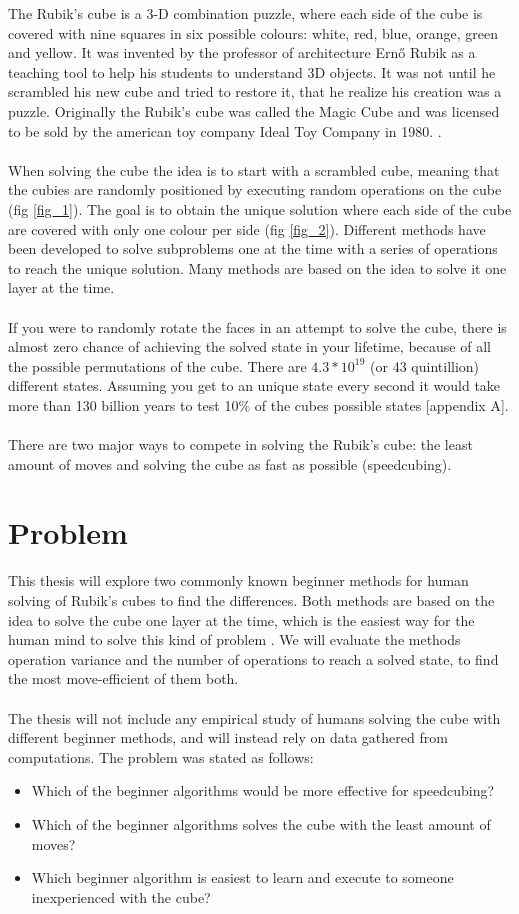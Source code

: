\documentclass[a4paper,11pt]{kth-mag}
\begin{document}
The Rubik’s cube is a 3-D combination puzzle, where each side of the cube is covered with nine squares in six possible colours: white, red, blue, orange, green and yellow. It was invented by the professor of architecture Ernő Rubik as a teaching tool to help his students to understand 3D objects. It was not until he scrambled his new cube and tried to restore it, that he realize his creation was a puzzle. Originally the Rubik's cube was called the Magic Cube and was licensed to be sold by the american toy company Ideal Toy Company in 1980. \cite{Rubiks}.\\\\
When solving the cube the idea is to start with a scrambled cube, meaning that the cubies are randomly positioned by executing random operations on the cube (fig \ref{fig_1}). The goal is to obtain the unique solution where each side of the cube are covered with only one colour per side (fig \ref{fig_2}). Different methods have been developed to solve subproblems one at the time with a series of operations to reach the unique solution. Many methods are based on the idea to solve it one layer at the time.\\\\
If you were to randomly rotate the faces in an attempt to solve the cube, there is almost zero chance of achieving the solved state in your lifetime, because of all the possible permutations of the cube. There are $4.3 * 10^{19}$ (or 43 quintillion) \cite{Faculty} different states. Assuming you get to an unique state every second it would take more than 130 billion years to test 10\% of the cubes possible states [appendix A].\\\\
There are two major ways to compete in solving the Rubik’s cube: the least amount of moves and solving the cube as fast as possible (speedcubing).

\section{Problem}
This thesis will explore two commonly known beginner methods for human solving of Rubik’s cubes to find the differences. Both methods are based on the idea to solve the cube one layer at the time, which is the easiest way for the human mind to solve this kind of problem \cite{Lar5}. We will evaluate the methods operation variance and the number of operations to reach a solved state, to find the most move-efficient of them both.\\\\
The thesis will not include any empirical study of humans solving the cube with different beginner methods, and will instead rely on data gathered from computations.
The problem was stated as follows:
\begin{itemize}
\item[] Which of the beginner algorithms would be more effective for speedcubing?
\item[] Which of the beginner algorithms solves the cube with the least amount of moves?
\item[] Which beginner algorithm is easiest to learn and execute to someone inexperienced with the cube?
\end{itemize}
\end{document}
